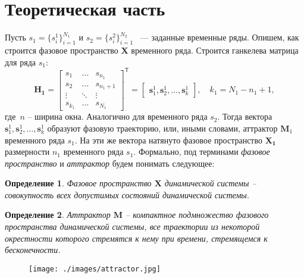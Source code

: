 \documentclass[12pt]{extarticle}
\newtheorem{definition}{Определение}
\begin{document}
\section{Теоретическая часть}
    Пусть $s_1 = \{s_i^1\}_{i=1}^{N_1}$ и $s_2 = \{s_i^2 \}_{i=1}^{N_2}$ ~--- заданные временные ряды. Опишем, как строится фазовое пространство $\mathbf{X}$ временного ряда. Строится ганкелева матрица для ряда $s_1$:
     \[ \mathbf{H_1} = \begin{bmatrix}
                        s_1 & \dots & s_{n_1} \\
                        s_2 & \dots & s_{n_1+1} \\
                        \vdots  &\ddots& \vdots \\
                        s_{k_1} & \dots & s_{N_1}
                    \end{bmatrix}^{\mathsf{T}} = 
                    \begin{bmatrix}
                        \mathbf{s}_1^1,
                        \mathbf{s}_2^1, 
                        \dots,
                        \mathbf{s}_k^1
                    \end{bmatrix}, \quad k_1 = N_1 - n_1 + 1, \]
где~$n$ -- ширина окна. Аналогично для временного ряда $s_2$. Тогда вектора $\mathbf{s}_1^1, \mathbf{s}_2^1, \dots, \mathbf{s}_k^1$ образуют фазовую траекторию, или, иными словами, аттрактор $\mathbf{M}_1$ временного ряда $s_1$. На эти же вектора натянуто фазовое пространство $\mathbf{X_1}$ размерности $n_1$ временного ряда $s_1$. Формально, под терминами \emph{фазовое пространство} и \emph{аттрактор} будем понимать следующее:

\begin{definition}
Фазовое пространство $\mathbf{X}$ динамической системы -- совокупность всех допустимых состояний динамической системы.
\end{definition}


\begin{definition}
Аттрактор $\mathbf{M}$ -- компактное подмножество фазового пространства динамической системы, все траектории из некоторой окрестности которого стремятся к нему при времени, стремящемся к бесконечности. 
\end{definition}

\begin{figure}[ht]
\centering
{\texttt{[image: ./images/attractor.jpg]}}
\caption{}
\label{fg:attractor}
\end{figure}
\end{document}
